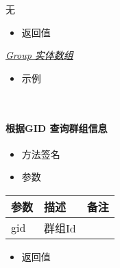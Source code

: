 \documentclass[letterpaper,10pt,english]{sphinxmanual}
\begin{document}
无
\begin{itemize}
\item {} 
返回值

\end{itemize}

{\hyperref[\detokenize{csharp:group}]{\emph{Group 实体数组}}}
\begin{itemize}
\item {} 
示例

\end{itemize}

%
\begin{sphinxVerbatim}[commandchars=\\\{\}]
   
   
\end{sphinxVerbatim}

​


\paragraph{根据GID 查询群组信息}
\label{\detokenize{csharp:gid}}\begin{itemize}
\item {} 
方法签名

\end{itemize}

%
\begin{sphinxVerbatim}[commandchars=\\\{\}]
   
\end{sphinxVerbatim}
\begin{itemize}
\item {} 
参数

\end{itemize}


\begin{savenotes}\sphinxattablestart
\centering
\begin{tabulary}{\linewidth}[t]{|T|T|T|}
\hline
\sphinxstyletheadfamily 
参数
&\sphinxstyletheadfamily 
描述
&\sphinxstyletheadfamily 
备注
\\
\hline
gid
&
群组Id
&\\
\hline
\end{tabulary}
\par
\sphinxattableend\end{savenotes}
\begin{itemize}
\item {} 
返回值

\end{itemize}
\end{document}
